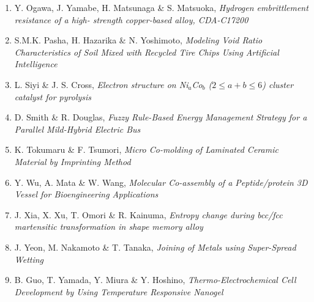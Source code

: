 \begin{enumerate}[label=A\arabic*]
\item  Y. Ogawa, J. Yamabe, H. Matsunaga \& S. Matsuoka, {\em Hydrogen embrittlement resistance of a high-
strength copper-based alloy, CDA-C17200}

\item S.M.K. Pasha, H. Hazarika \& N. Yoshimoto, {\em Modeling Void Ratio Characteristics of Soil
Mixed with Recycled Tire Chips Using Artificial
Intelligence}

\item L. Siyi \& J. S. Cross, {\em Electron structure on Ni$_a$Co$_b$ ($2 \le a+b \le 6$) cluster catalyst for pyrolysis}

\item D. Smith \& R. Douglas, {\em Fuzzy Rule-Based Energy Management Strategy
for a Parallel Mild-Hybrid Electric Bus}

\item K. Tokumaru \& F. Tsumori, {\em Micro Co-molding of Laminated Ceramic
Material by Imprinting Method}

\item Y. Wu, A. Mata \& W. Wang, {\em Molecular Co-assembly of a Peptide/protein 3D
Vessel for Bioengineering Applications}

\item   J. Xia, X. Xu, T. Omori \& R. Kainuma, {\em Entropy change during bcc/fcc martensitic
transformation in  shape memory
alloy}

\item J. Yeon, M. Nakamoto \& T. Tanaka, {\em Joining of Metals using Super-Spread Wetting}

\item B. Guo, T. Yamada, Y. Miura \& Y. Hoshino, {\em Thermo-Electrochemical Cell Development by Using Temperature Responsive Nanogel}

\end{enumerate}
\newpage
{}%
\renewcommand*{\thepage}{A\arabic{page}}
 
 

 

 

 

